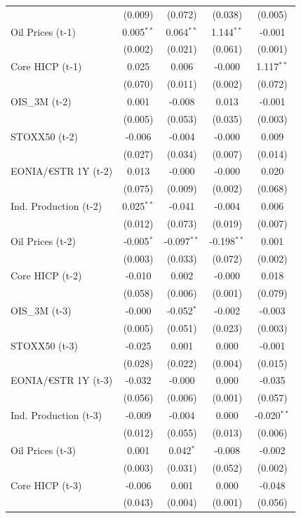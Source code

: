 \begin{longtable}[t]{lcccc}
 & (0.009) & (0.072) & (0.038) & (0.005)\\
Oil Prices (t-1) & 0.005$^{**}$ & 0.064$^{**}$ & 1.144$^{**}$ & -0.001\\
 & (0.002) & (0.021) & (0.061) & (0.001)\\
Core HICP (t-1) & 0.025 & 0.006 & -0.000 & 1.117$^{**}$\\
 & (0.070) & (0.011) & (0.002) & (0.072)\\
OIS\_3M (t-2) & 0.001 & -0.008 & 0.013 & -0.001\\
 & (0.005) & (0.053) & (0.035) & (0.003)\\
STOXX50 (t-2) & -0.006 & -0.004 & -0.000 & 0.009\\
 & (0.027) & (0.034) & (0.007) & (0.014)\\
EONIA/€STR 1Y (t-2) & 0.013 & -0.000 & -0.000 & 0.020\\
 & (0.075) & (0.009) & (0.002) & (0.068)\\
Ind. Production (t-2) & 0.025$^{**}$ & -0.041 & -0.004 & 0.006\\
 & (0.012) & (0.073) & (0.019) & (0.007)\\
Oil Prices (t-2) & -0.005$^{*}$ & -0.097$^{**}$ & -0.198$^{**}$ & 0.001\\
 & (0.003) & (0.033) & (0.072) & (0.002)\\
Core HICP (t-2) & -0.010 & 0.002 & -0.000 & 0.018\\
 & (0.058) & (0.006) & (0.001) & (0.079)\\
OIS\_3M (t-3) & -0.000 & -0.052$^{*}$ & -0.002 & -0.003\\
 & (0.005) & (0.051) & (0.023) & (0.003)\\
STOXX50 (t-3) & -0.025 & 0.001 & 0.000 & -0.001\\
 & (0.028) & (0.022) & (0.004) & (0.015)\\
EONIA/€STR 1Y (t-3) & -0.032 & -0.000 & 0.000 & -0.035\\
 & (0.056) & (0.006) & (0.001) & (0.057)\\
Ind. Production (t-3) & -0.009 & -0.004 & 0.000 & -0.020$^{**}$\\
 & (0.012) & (0.055) & (0.013) & (0.006)\\
Oil Prices (t-3) & 0.001 & 0.042$^{*}$ & -0.008 & -0.002\\
 & (0.003) & (0.031) & (0.052) & (0.002)\\
Core HICP (t-3) & -0.006 & 0.001 & 0.000 & -0.048\\
 & (0.043) & (0.004) & (0.001) & (0.056)\\

\end{longtable}
